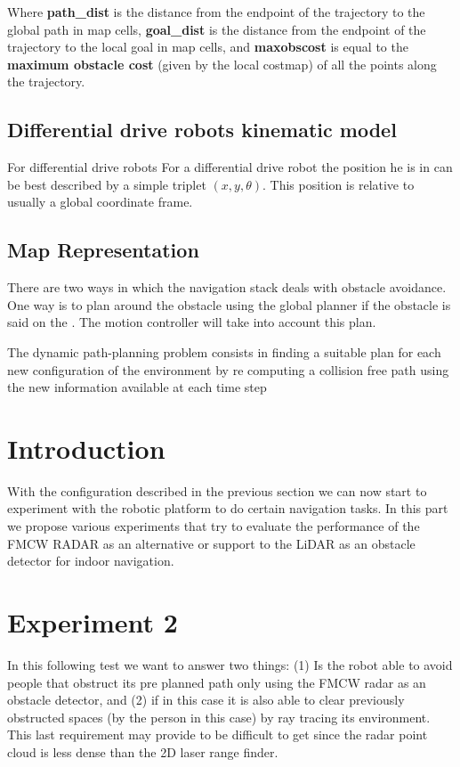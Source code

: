 \begin{itemize}
    Where \textbf{path\_dist} is the distance from the endpoint of the trajectory to the global path in map cells, \textbf{goal\_dist} is the distance from the endpoint of the trajectory to the local goal in map cells, and \textbf{maxobscost} is equal to the \textbf{maximum obstacle cost} (given by the local costmap) of all the points along the trajectory.
    \end{itemize}

\subsection{Differential drive robots kinematic model}
For differential drive robots 
For a differential drive robot the position he is in can be best described by a simple triplet $(x,y,\theta)$. This position is relative to usually a  global coordinate frame. 
\subsection{Map Representation}



There are two ways in which the navigation stack deals with obstacle avoidance. One way is to plan around the obstacle using the global planner if the obstacle is said on the .
The motion controller will take into account this plan. 










The dynamic path-planning problem consists in finding a suitable plan for each new configuration of the environment by re computing a collision free path using the new information available at each time step

\section{Introduction}
With the configuration described in the previous section we can now start to experiment with the robotic platform to do certain navigation tasks. In this part we propose various experiments that try to evaluate the  performance of the \ac{FMCW} \ac{RADAR} as an alternative or support to the \ac{LiDAR} as an obstacle detector for indoor navigation.
\section {Experiment 2}
In this following test we want to answer two things: (1) Is the robot able to avoid people that obstruct its pre planned path only using the  \ac{FMCW} radar as an obstacle detector, and (2) if in this case it is also able to clear previously obstructed spaces (by the person in this case) by ray tracing its environment. This last requirement may provide to be difficult to get since the radar point cloud is less dense than the 2D laser range finder.
